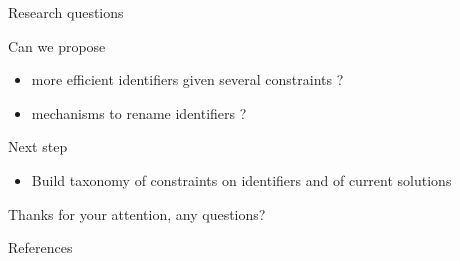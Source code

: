 \documentclass[10pt]{beamer}
\begin{document}
\begin{frame}{Research questions}
  \begin{block}{Can we propose}
    \begin{itemize}
      \item more efficient identifiers given several constraints ?
      \item mechanisms to rename identifiers ?
    \end{itemize}
  \end{block}
\end{frame}

\begin{frame}{Next step}
  \begin{itemize}
    \item Build taxonomy of constraints on identifiers and of current solutions
  \end{itemize}
\end{frame}

\begin{frame}[standout]
  Thanks for your attention, any questions?
\end{frame}

\begin{frame}[allowframebreaks]{References}
	
	
\end{frame}
\end{document}
